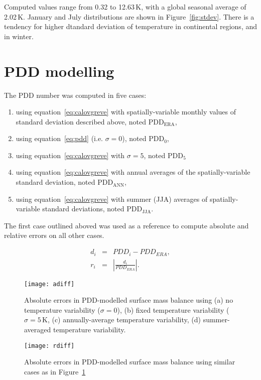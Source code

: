 \documentclass[twocolumn]{igs}
\begin{document}
Computed values range from 0.32 to 12.63\,K, with a global seasonal average of 2.02\,K. January and July distributions are shown in Figure~\ref{fig:stdev}. There is a tendency for higher dtandard deviation of temperature in continental regions, and in winter.


\section{PDD modelling}

The PDD number was computed in five cases:

\begin{enumerate}
  \item using equation~\ref{eq:calovgreve} with spatially-variable monthly values of standard deviation described above, noted $\mathrm{PDD_{ERA}}$,
  \item using equation~\ref{eq:pdd} (i.e. $\sigma=0$), noted $\mathrm{PDD_{0}}$,
  \item using equation~\ref{eq:calovgreve} with $\sigma=5$, noted $\mathrm{PDD_{5}}$
  \item using equation~\ref{eq:calovgreve} with annual averages of the spatially-variable standard deviation, noted $\mathrm{PDD_{ANN}}$,
  \item using equation~\ref{eq:calovgreve} with summer (JJA) averages of spatially-variable standard deviations, noted $\mathrm{PDD_{JJA}}$.
\end{enumerate}

The first case outlined aboved was used as a reference to compute absolute and relative errors on all other cases.

\begin{eqnarray}
  d_i &=& PDD_i - PDD_{ERA}, \\
  r_i &=& \left|\frac{d_i}{PDD_{ERA}}\right|.
\end{eqnarray}

\begin{figure}
  \centering\texttt{[image: adiff]}
  \caption{Absolute errors in PDD-modelled surface mass balance using (a) no temperature variability ($\sigma=0$), (b) fixed temperature variability ($\sigma=5\,\mathrm{K}$, (c) annually-average temperature variability, (d) summer-averaged temperature variability.}
  \label{fig:adiff}
\end{figure}

\begin{figure}
  \centering\texttt{[image: rdiff]}
  \caption{Absolute errors in PDD-modelled surface mass balance using similar cases as in Figure~\ref{fig:adiff}}
  \label{fig:rdiff}
\end{figure}
\end{document}
